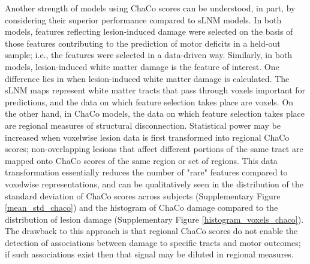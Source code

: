 \documentclass[10pt]{article}
\begin{document}
Another strength of models using ChaCo scores can be understood, in part, by considering their superior performance compared to sLNM models. In both models, features reflecting lesion-induced damage were selected on the basis of those features contributing to the prediction of motor deficits in a held-out sample; i.e., the features were selected in a data-driven way. Similarly, in both models, lesion-induced white matter damage is the feature of interest. One difference lies in when lesion-induced white matter damage is calculated. The sLNM maps represent white matter tracts that pass through voxels important for predictions, and the data on which feature selection takes place are voxels. On the other hand, in ChaCo models, the data on which feature selection takes place are regional measures of structural disconnection. Statistical power may be increased when voxelwise lesion data is first transformed into regional ChaCo scores; non-overlapping lesions that affect different portions of the same tract are mapped onto ChaCo scores of the same region or set of regions. This data transformation essentially reduces the number of "rare" features compared to voxelwise representations, and can be qualitatively seen in the distribution of the standard deviation of ChaCo scores across subjects (Supplementary Figure \ref{mean_std_chaco}) and the histogram of ChaCo damage compared to the distribution of lesion damage (Supplementary Figure \ref{histogram_voxels_chaco}). The drawback to this approach is that regional ChaCo scores do not enable the detection of associations between damage to specific tracts and motor outcomes; if such associations exist then that signal may be diluted in regional measures. 
\end{document}
